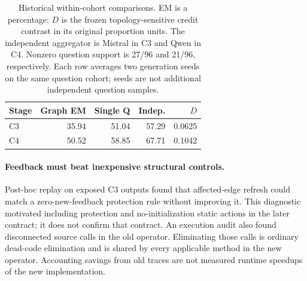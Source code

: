 \begin{table}[t]
\centering\small
\begin{tabular}{lrrrr}
\hline
Stage & Graph EM & Single Q & Indep. & $D$ \\
\hline
C3 & 35.94 & 51.04 & 57.29 & 0.0625 \\
C4 & 50.52 & 58.85 & 67.71 & 0.1042 \\
\hline
\end{tabular}
\caption{Historical within-cohort comparisons. EM is a percentage;
$D$ is the frozen topology-sensitive credit contrast in its original
proportion units. The independent aggregator is Mistral in C3 and Qwen
in C4. Nonzero question support is 27/96 and 21/96, respectively.
Each row averages two generation seeds on the same question cohort;
seeds are not additional independent question samples.}
\label{tab:prior}
\end{table}

\paragraph{Feedback must beat inexpensive structural controls.}
Post-hoc replay on exposed C3 outputs found that affected-edge refresh
could match a zero-new-feedback protection rule without improving it.
This diagnostic motivated including protection and no-initialization
static actions in the later contract; it does not confirm that contract.
An execution audit also found disconnected source calls in the old operator.
Eliminating those calls is ordinary dead-code elimination and is shared
by every applicable method in the new operator. Accounting savings from
old traces are not measured runtime speedups of the new implementation.
